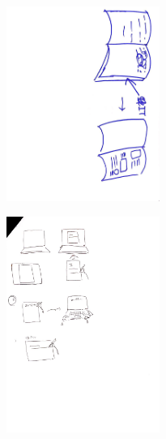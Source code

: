 \documentclass{funthesis}
\begin{document}
\begin{figure}[H]
 \begin{minipage}{0.47\hsize}
 \begin{center}
\includegraphics[width=50mm]{figures/group1.jpg}
 \end{center}
 \label{fig:seven}
 \end{minipage}
 \begin{minipage}{0.47\hsize}
 \begin{center}
 \includegraphics[width=50mm]{figures/group2.jpg}
 \end{center}
 \label{fig:eight}
 \end{minipage}
\end{figure}
\end{document}
